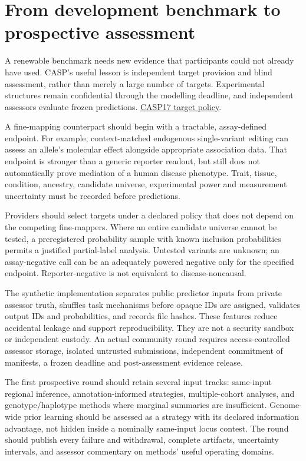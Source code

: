 \documentclass[
  british,
  10pt,
]{article}
\begin{document}
\section{From development benchmark to prospective
assessment}\label{from-development-benchmark-to-prospective-assessment}

A renewable benchmark needs new evidence that participants could not
already have used. CASP's useful lesson is independent target provision
and blind assessment, rather than merely a large number of targets.
Experimental structures remain confidential through the modelling
deadline, and independent assessors evaluate frozen predictions.
\href{https://predictioncenter.org/casp17/callForTargets.cgi}{CASP17
target policy}.

A fine-mapping counterpart should begin with a tractable, assay-defined
endpoint. For example, context-matched endogenous single-variant editing
can assess an allele's molecular effect alongside appropriate
association data. That endpoint is stronger than a generic reporter
readout, but still does not automatically prove mediation of a human
disease phenotype. Trait, tissue, condition, ancestry, candidate
universe, experimental power and measurement uncertainty must be
recorded before predictions.

Providers should select targets under a declared policy that does not
depend on the competing fine-mappers. Where an entire candidate universe
cannot be tested, a preregistered probability sample with known
inclusion probabilities permits a justified partial-label analysis.
Untested variants are unknown; an assay-negative call can be an
adequately powered negative only for the specified endpoint.
Reporter-negative is not equivalent to disease-noncausal.

The synthetic implementation separates public predictor inputs from
private assessor truth, shuffles task mechanisms before opaque IDs are
assigned, validates output IDs and probabilities, and records file
hashes. These features reduce accidental leakage and support
reproducibility. They are not a security sandbox or independent custody.
An actual community round requires access-controlled assessor storage,
isolated untrusted submissions, independent commitment of manifests, a
frozen deadline and post-assessment evidence release.

The first prospective round should retain several input tracks:
same-input regional inference, annotation-informed strategies,
multiple-cohort analyses, and genotype/haplotype methods where marginal
summaries are insufficient. Genome-wide prior learning should be
assessed as a strategy with its declared information advantage, not
hidden inside a nominally same-input locus contest. The round should
publish every failure and withdrawal, complete artifacts, uncertainty
intervals, and assessor commentary on methods' useful operating domains.
\end{document}
